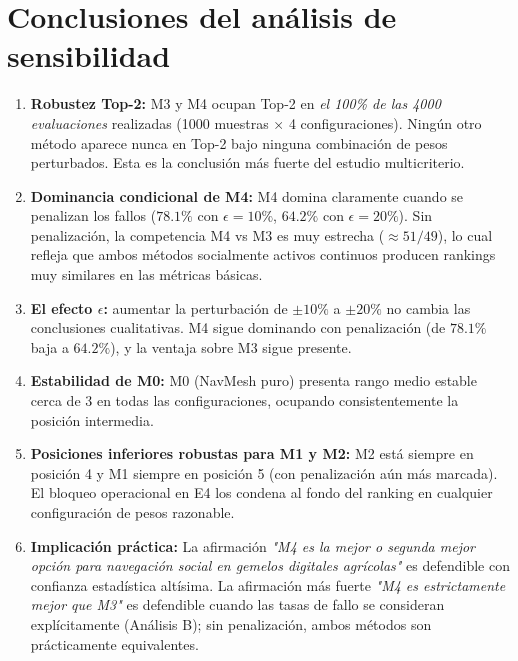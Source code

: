 \documentclass[12pt,a4paper,oneside]{book}
\begin{document}
\section{Conclusiones del análisis de sensibilidad}

\begin{enumerate}[leftmargin=*]
    \item \textbf{Robustez Top-2:} M3 y M4 ocupan Top-2 en \emph{el 100\% de las 4000 evaluaciones} realizadas (1000 muestras × 4 configuraciones). Ningún otro método aparece nunca en Top-2 bajo ninguna combinación de pesos perturbados. Esta es la conclusión más fuerte del estudio multicriterio.
    
    \item \textbf{Dominancia condicional de M4:} M4 domina claramente cuando se penalizan los fallos ($78.1\%$ con $\epsilon=10\%$, $64.2\%$ con $\epsilon=20\%$). Sin penalización, la competencia M4 vs M3 es muy estrecha ($\approx 51/49$), lo cual refleja que ambos métodos socialmente activos continuos producen rankings muy similares en las métricas básicas.
    
    \item \textbf{El efecto $\epsilon$:} aumentar la perturbación de $\pm 10\%$ a $\pm 20\%$ no cambia las conclusiones cualitativas. M4 sigue dominando con penalización (de $78.1\%$ baja a $64.2\%$), y la ventaja sobre M3 sigue presente.
    
    \item \textbf{Estabilidad de M0:} M0 (NavMesh puro) presenta rango medio estable cerca de 3 en todas las configuraciones, ocupando consistentemente la posición intermedia.
    
    \item \textbf{Posiciones inferiores robustas para M1 y M2:} M2 está siempre en posición 4 y M1 siempre en posición 5 (con penalización aún más marcada). El bloqueo operacional en E4 los condena al fondo del ranking en cualquier configuración de pesos razonable.
    
    \item \textbf{Implicación práctica:} La afirmación \emph{"M4 es la mejor o segunda mejor opción para navegación social en gemelos digitales agrícolas"} es defendible con confianza estadística altísima. La afirmación más fuerte \emph{"M4 es estrictamente mejor que M3"} es defendible cuando las tasas de fallo se consideran explícitamente (Análisis B); sin penalización, ambos métodos son prácticamente equivalentes.
\end{enumerate}
\end{document}
